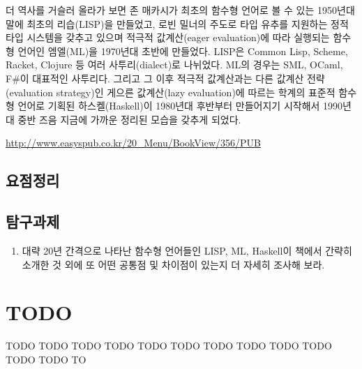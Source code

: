 \documentclass[b5paper,chapter,figtabcapt]{oblivoir}
\begin{document}
더 역사를 거슬러 올라가 보면 존 매카시가 최초의 함수형 언어로
볼 수 있는 1950년대 말에 최초의 리습(LISP)을 만들었고,
로빈 밀너의 주도로 타입 유추를 지원하는 정적 타입 시스템을 갖추고
있으며 적극적 값계산(eager evaluation)에 따라 실행되는 함수형 언어인
엠엘(ML)을 1970년대 초반에 만들었다. LISP은 Common Lisp, Scheme,
Racket, Clojure 등 여러 사투리(dialect)로 나뉘었다.
ML의 경우는 SML, OCaml, F\#이 대표적인 사투리다. 그리고
그 이후 적극적 값계산과는 다른 값계산 전략(evaluation strategy)인
게으른 값계산(lazy evaluation)에 따르는 학계의 표준적
함수형 언어로 기획된 하스켈(Haskell)이 1980년대 후반부터
만들어지기 시작해서 1990년대 중반 즈음 지금에 가까운
정리된 모습을 갖추게 되었다\cite{Hudak2007HistoryHaskell}.



\url{http://www.easyspub.co.kr/20_Menu/BookView/356/PUB}

\section*{요점정리}
\section*{탐구과제}
\begin{enumerate}
 \item 대략 20년 간격으로 나타난 함수형 언어들인 LISP, ML, Haskell이
       책에서 간략히 소개한 것 외에 또 어떤 공통점 및 차이점이 있는지
       더 자세히 조사해 보라.
\end{enumerate}


\chapter{TODO}
TODO TODO TODO TODO TODO TODO TODO TODO TODO TODO TODO TODO TO

\printbibliography[title=참고문헌]
\end{document}
